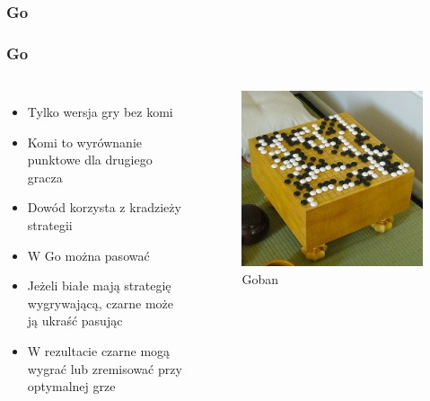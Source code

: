 \documentclass[polish,envcountsect,10pt]{beamer}
\begin{document}
            \subsubsection{Go}
                \begin{frame}
                    \frametitle{Go}
                    \begin{columns}
                            \begin{itemize}
                                \item<1-> Tylko wersja gry bez komi
                                \item<2-> Komi to wyrównanie punktowe dla drugiego gracza
                                \item<3-> Dowód korzysta z kradzieży strategii
                                \item<4-> W Go można pasować
                                \item<5-> Jeżeli białe mają strategię wygrywającą, czarne może ją ukraść pasując
                                \item<6-> W rezultacie czarne mogą wygrać lub zremisować przy optymalnej grze
                            \end{itemize}
                            \begin{figure}[H]
                                \centering
                                \includegraphics[width=\textwidth]{images/496px-FloorGoban.jpg}
                                \caption{Goban}
                            \end{figure} 
                    \end{columns}                    
                \end{frame}
            
\end{document}
